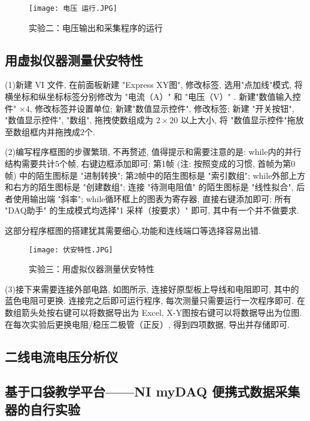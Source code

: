 \documentclass[11pt]{article}
\begin{document}
\begin{figure}[htbp]
    \centering
    \texttt{[image: 电压 运行.JPG]}
    \caption{实验二：电压输出和采集程序的运行}
\end{figure}

\subsection{用虚拟仪器测量伏安特性}

(1)新建 VI 文件, 在前面板新建 "Express XY图", 
修改标签, 选用"点加线"模式, 将横坐标和纵坐标标签分别修改为 
"电流（A）" 和 "电压（V）" . 新建"数值输入控件" $\times 4$, 
修改标签并设置单位; 新建"数值显示控件", 修改标签; 新建 "开关按钮", 
"数值显示控件", "数组", 拖拽使数组成为 $2\times 20$ 以上大小, 
将 "数值显示控件"拖放至数组框内并拖拽成$2$个.

(2)编写程序框图的步骤繁琐, 不再赘述, 
值得提示和需要注意的是: while内的并行结构需要共计5个帧, 
右键边框添加即可; 第1帧 (注: 按照变成的习惯, 首帧为第0帧) 
中的陌生图标是 "进制转换"; 第2帧中的陌生图标是 "索引数组"; 
while外部上方和右方的陌生图标是 "创建数组"; 连接 "待测电阻值" 的陌生图标是 "线性拟合", 
后者使用输出端 "斜率"; while循环框上的图表为寄存器, 直接右键添加即可; 
所有 "DAQ助手" 的生成模式均选择"1 采样（按要求）" 即可, 
其中有一个并不做要求.

这部分程序框图的搭建犹其需要细心,功能和连线端口等选择容易出错.
\begin{figure}[htbp]
    \centering
    \texttt{[image: 伏安特性.JPG]}
    \caption{实验三：用虚拟仪器测量伏安特性}
\end{figure}

(3)接下来需要连接外部电路, 如图所示, 
连接好原型板上导线和电阻即可, 其中的蓝色电阻可更换. 
连接完之后即可运行程序, 每次测量只需要运行一次程序即可. 
在数组箭头处按右键可以将数据导出为 Excel, X-Y图按右键可以将数据导出为位图. 
在每次实验后更换电阻/稳压二极管（正反）, 得到四项数据, 
导出并存储即可. 




\subsection{二线电流电压分析仪}
\subsection{基于口袋教学平台——NI myDAQ 便携式数据采集器的自行实验}
\end{document}
